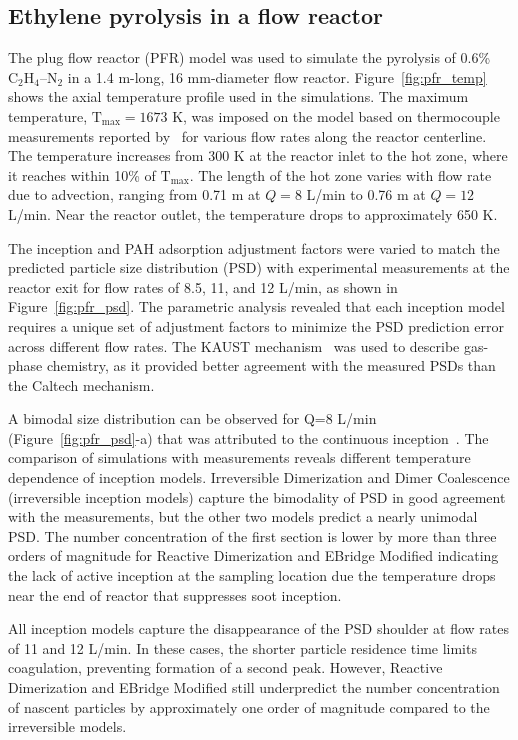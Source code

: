 \subsection{Ethylene pyrolysis in a flow reactor}
The plug flow reactor (PFR) model was used to simulate the pyrolysis of 0.6\% $\mathrm{C_2H_4}$–$\mathrm{N_2}$ in a 1.4 m-long, 16 mm-diameter flow reactor. Figure~\ref{fig:pfr_temp} shows the axial temperature profile used in the simulations. The maximum temperature, $\mathrm{T_{max}} = 1673$ K, was imposed on the model based on thermocouple measurements reported by~\citet{mei2019quantitative} for various flow rates along the reactor centerline. The temperature increases from 300 K at the reactor inlet to the hot zone, where it reaches within 10\% of $\mathrm{T_{max}}$. The length of the hot zone varies with flow rate due to advection, ranging from 0.71 m at $Q = 8$ L/min to 0.76 m at $Q = 12$ L/min. Near the reactor outlet, the temperature drops to approximately 650 K.

The inception and PAH adsorption adjustment factors were varied to match the predicted particle size distribution (PSD) with experimental measurements at the reactor exit for flow rates of 8.5, 11, and 12 L/min, as shown in Figure~\ref{fig:pfr_psd}. The parametric analysis revealed that each inception model requires a unique set of adjustment factors to minimize the PSD prediction error across different flow rates. The KAUST mechanism~\citep{wang2013pah} was used to describe gas-phase chemistry, as it provided better agreement with the measured PSDs than the Caltech mechanism.

A bimodal size distribution can be observed for Q=8 L/min (Figure~\ref{fig:pfr_psd}-a) that was attributed to the continuous inception~\citep{zhao2003measurement}. The comparison of simulations with measurements reveals different temperature dependence of inception models. Irreversible Dimerization and Dimer Coalescence (irreversible inception models) capture the bimodality of PSD in good agreement with the measurements, but the other two models predict a nearly unimodal PSD. The number concentration of the first section is lower by more than three orders of magnitude for Reactive Dimerization and EBridge Modified indicating the lack of active inception at the sampling location due the temperature drops near the end of reactor that suppresses soot inception.

All inception models capture the disappearance of the PSD shoulder at flow rates of 11 and 12 L/min. In these cases, the shorter particle residence time limits coagulation, preventing formation of a second peak. However, Reactive Dimerization and EBridge Modified still underpredict the number concentration of nascent particles by approximately one order of magnitude compared to the irreversible models.

